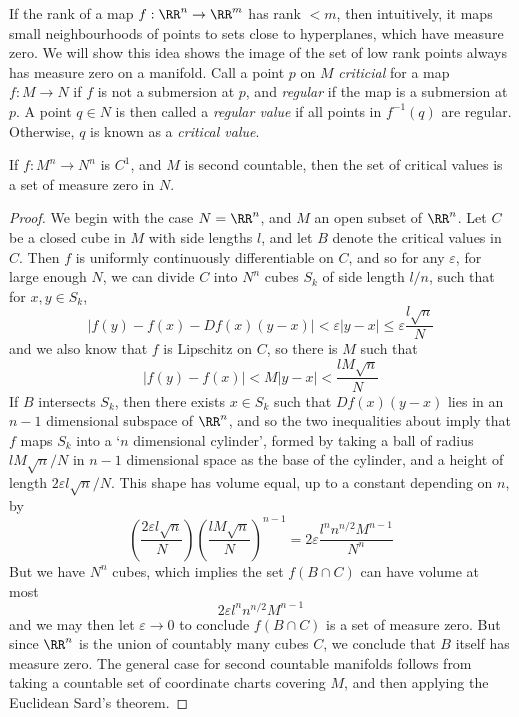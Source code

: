 If the rank of a map $f: \RR^n \to \RR^m$ has rank $< m$, then intuitively, it maps small neighbourhoods of points to sets close to hyperplanes, which have measure zero. We will show this idea shows the image of the set of low rank points always has measure zero on a manifold. Call a point $p$ on $M$ \emph{criticial} for a map $f:M \to N$ if $f$ is not a submersion at $p$, and \emph{regular} if the map is a submersion at $p$. A point $q \in N$ is then called a \emph{regular value} if all points in $f^{-1}(q)$ are regular. Otherwise, $q$ is known as a \emph{critical value}.

\begin{theorem}[Sard]
    If $f: M^n \to N^n$ is $C^1$, and $M$ is second countable, then the set of critical values is a set of measure zero in $N$.
\end{theorem}
\begin{proof}
    We begin with the case $N = \RR^n$, and $M$ an open subset of $\RR^n$. Let $C$ be a closed cube in $M$ with side lengths $l$, and let $B$ denote the critical values in $C$. Then $f$ is uniformly continuously differentiable on $C$, and so for any $\varepsilon$, for large enough $N$, we can divide $C$ into $N^n$ cubes $S_k$ of side length $l/n$, such that for $x,y \in S_k$,
    \[ |f(y) - f(x) - Df(x)(y - x)| < \varepsilon |y - x| \leq \varepsilon \frac{l \sqrt{n}}{N} \]
    and we also know that $f$ is Lipschitz on $C$, so there is $M$ such that
    \[ |f(y) - f(x)| < M|y - x| < \frac{lM \sqrt{n}}{N} \]
    If $B$ intersects $S_k$, then there exists $x \in S_k$ such that $Df(x)(y-x)$ lies in an $n-1$ dimensional subspace of $\RR^n$, and so the two inequalities about imply that $f$ maps $S_k$ into a `$n$ dimensional cylinder', formed by taking a ball of radius $lM \sqrt{n}/N$ in $n-1$ dimensional space as the base of the cylinder, and a height of length $2 \varepsilon l\sqrt{n}/N$. This shape has volume equal, up to a constant depending on $n$, by
    \[ \left( \frac{2 \varepsilon l \sqrt{n}}{N} \right) \left( \frac{lM \sqrt{n}}{N} \right)^{n-1} = 2 \varepsilon \frac{l^n n^{n/2} M^{n-1}}{N^n} \]
    But we have $N^n$ cubes, which implies the set $f(B \cap C)$ can have volume at most
    \[ 2 \varepsilon l^n n^{n/2} M^{n-1} \]
    and we may then let $\varepsilon \to 0$ to conclude $f(B \cap C)$ is a set of measure zero. But since $\RR^n$ is the union of countably many cubes $C$, we conclude that $B$ itself has measure zero. The general case for second countable manifolds follows from taking a countable set of coordinate charts covering $M$, and then applying the Euclidean Sard's theorem.
\end{proof}

